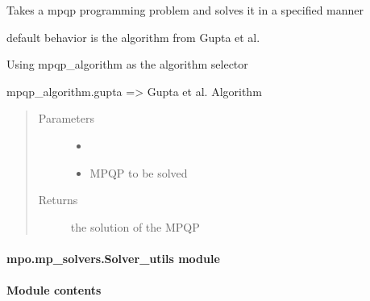 \documentclass[letterpaper,10pt,english]{sphinxmanual}
\begin{document}
\begin{fulllineitems}
\label{\detokenize{mpo.mp_solvers:mpo.mp_solvers.solve_mpqp.solve_mpqp}}
\sphinxAtStartPar
Takes a mpqp programming problem and solves it in a specified manner

\sphinxAtStartPar
default behavior is the algorithm from Gupta et al.

\sphinxAtStartPar
Using mpqp\_algorithm as the algorithm selector

\sphinxAtStartPar
mpqp\_algorithm.gupta =\textgreater{} Gupta et al. Algorithm
\begin{quote}\begin{description}
\item[{Parameters}] \leavevmode\begin{itemize}
\item {} 
\sphinxAtStartPar
{} \textendash{} 

\item {} 
\sphinxAtStartPar
{} \textendash{} MPQP to be solved

\end{itemize}

\item[{Returns}] \leavevmode
\sphinxAtStartPar
the solution of the MPQP

\end{description}\end{quote}

\end{fulllineitems}



\paragraph{mpo.mp\_solvers.Solver\_utils module}
\label{\detokenize{mpo.mp_solvers:mpo-mp-solvers-Solver-utils-module}}

\paragraph{Module contents}
\label{\detokenize{mpo.mp_solvers:module-mpo.mp_solvers}}\label{\detokenize{mpo.mp_solvers:module-contents}}
\end{document}
